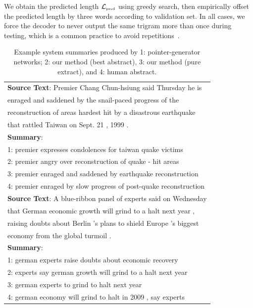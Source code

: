 \documentclass[letterpaper]{article} %
\begin{document}
We obtain the predicted length $\mathcal{L}_{\mbox{\tiny pred}}$ using greedy search, then empirically offset the predicted length by three words according to validation set.
In all cases, we force the decoder to never output the same trigram more than once during testing, which is a common practice to avoid repetitions~\cite{Paulus:2017}.


\begin{table}[t]
\centering
\setlength{\tabcolsep}{0pt}
\begin{small}
\begin{tabular}{l}
\toprule
\textbf{Source Text}: Premier Chang Chun-hsiung said Thursday he is \\
enraged and saddened by the snail-paced progress of the \\
reconstruction of areas hardest hit by a disastrous earthquake \\
that rattled Taiwan on Sept. 21 , 1999 .\\
\midrule
\textbf{Summary}:\\
1: premier expresses condolences for taiwan quake victims\\
2: premier angry over reconstruction of quake - hit areas\\
3: premier enraged and saddened by earthquake reconstruction\\
4: premier enraged by slow progress of post-quake reconstruction\\
\bottomrule
\toprule
\textbf{Source Text}: A blue-ribbon panel of experts said on Wednesday\\
that German economic growth will grind to a halt next year , \\
raising doubts about Berlin 's plans to shield Europe 's biggest \\
economy from the global turmoil .\\
\midrule
\textbf{Summary}:\\
1: german experts raise doubts about economic recovery\\
2: experts say german growth will grind to a halt next year\\
3: german experts to grind to halt next year\\
4: german economy will grind to halt in 2009 , say experts\\
\bottomrule
\end{tabular}
\end{small}
\caption{Example system summaries produced by
1: pointer-generator networks; 2: our method (best abstract), 3: our method (pure extract), and 4: human abstract.
}
\label{tab:output}
\end{table}
\end{document}
